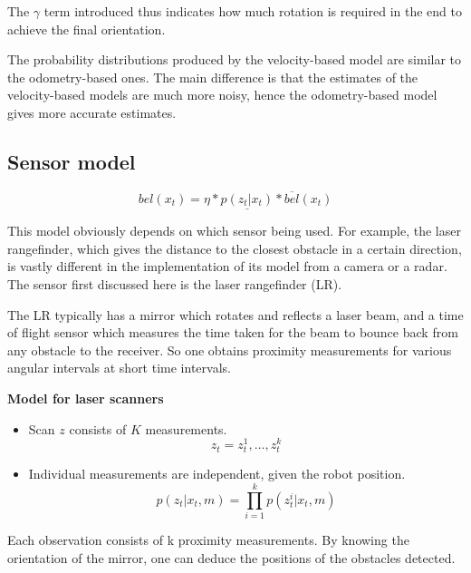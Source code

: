 \documentclass[a4paper]{article}
\begin{document}
\begin{enumerate}
    The $\gamma$ term introduced thus indicates how much rotation is required in the end to achieve the final orientation.
    
    The probability distributions produced by the velocity-based model are similar to the odometry-based ones. The main difference is that the estimates of the velocity-based models are much more noisy, hence the odometry-based model gives more accurate estimates.
    
\end{enumerate}

\subsection{Sensor model}

\begin{equation*}
    bel(x_t) = \eta * \underline{p(z_t | x_t)} * \overline{bel}(x_t)
\end{equation*}

This model obviously depends on which sensor being used. For example, the laser rangefinder, which gives the distance to the closest obstacle in a certain direction, is vastly different in the implementation of its model from a camera or a radar. The sensor first discussed here is the laser rangefinder (LR).

The LR typically has a mirror which rotates and reflects a laser beam, and a time of flight sensor which measures the time taken for the beam to bounce back from any obstacle to the receiver. So one obtains proximity measurements for various angular intervals at short time intervals.

\textbf{Model for laser scanners}

\begin{itemize}
    \item Scan $z$ consists of $K$ measurements.
    \begin{equation*}
        z_t = {z_t^1, \ldots , z_t^k}
    \end{equation*}
    \item Individual measurements are independent, given the robot position.
    \begin{equation*}
        p(z_t | x_t, m) = \prod_{i=1}^k p(z_t^i | x_t, m)
    \end{equation*}
\end{itemize}

Each observation consists of k proximity measurements. By knowing the orientation of the mirror, one can deduce the positions of the obstacles detected. 
\end{document}
